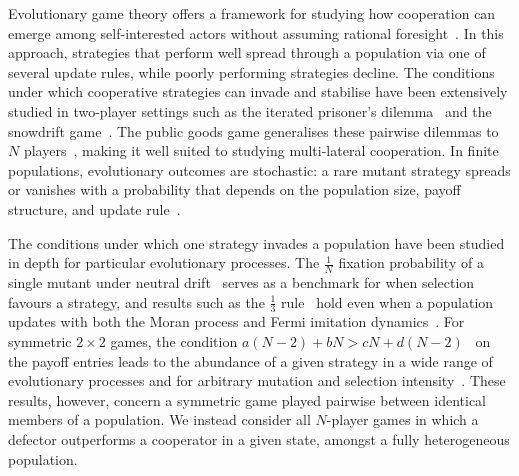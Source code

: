 \documentclass{article}
\begin{document}
Evolutionary game theory offers a framework for studying how cooperation can
emerge among self-interested actors without assuming rational
foresight~\cite{hofbauer_sigmund_1998, 568a8a9c-d8ae-3d24-9fc2-3d33340230e7}. In
this approach, strategies that perform well spread through a population via one
of several update rules, while poorly performing strategies decline. The
conditions under which cooperative strategies can invade and stabilise have been
extensively studied in two-player settings such as the iterated prisoner's
dilemma~\cite{b5d8eed6-6ac7-35c7-953f-9af57df3f45e} and the snowdrift
game~\cite{hauert_spatial_2004}. The public goods game generalises these pairwise
dilemmas to \(N\) players~\cite{hauert2002volunteering}, making it well suited
to studying multi-lateral cooperation. In finite populations, evolutionary
outcomes are stochastic: a rare mutant strategy spreads or vanishes with a
probability that depends on the population size, payoff structure, and update
rule~\cite{Nowak2004Emergence, traulsen2006stochastic}. 

The conditions under which one strategy invades a population have been studied
in depth for particular evolutionary processes. The \(\frac{1}{N}\) fixation
probability of a single mutant under neutral
drift~\cite{568a8a9c-d8ae-3d24-9fc2-3d33340230e7} serves as a benchmark for when
selection favours a strategy, and results such as the \(\frac{1}{3}\)
rule~\cite{Nowak2004Emergence,OHTSUKI2007289} hold even when a population
updates with both the Moran process and Fermi imitation
dynamics~\cite{LIU2017336}. For symmetric \(2\times2\) games, the condition
\(a(N-2) + bN > cN + d(N-2)\)~\cite{Kandori, tarnita_strategy_2009} on the
payoff entries leads to the abundance of a given strategy in a wide range of
evolutionary processes and for arbitrary mutation and selection
intensity~\cite{ANTAL2009340}. These results, however, concern a symmetric game
played pairwise between identical members of a population. We instead consider
all \(N\)-player games in which a defector outperforms a cooperator in a given
state, amongst a fully heterogeneous population.
\end{document}
